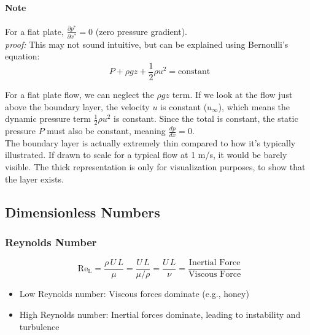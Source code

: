 \paragraph{Note} For a flat plate, $\frac{\partial p^*}{\partial x^*} = 0$ (zero pressure gradient).
\\[1em]
\textit{proof:} This may not sound intuitive, but can be explained using Bernoulli's equation:
\[
P + \rho gz + \frac{1}{2}\rho u^2 = \text{constant}
\]

For a flat plate flow, we can neglect the $\rho gz$ term. If we look at the flow just above the boundary layer, the velocity $u$ is constant ($u_\infty$), which means the dynamic pressure term $\frac{1}{2}\rho u^2$ is constant. Since the total is constant, the static pressure $P$ must also be constant, meaning $\frac{dp}{dx} = 0$.
\\[1em]
The boundary layer is actually extremely thin compared to how it's typically illustrated. If drawn to scale for a typical flow at 1 m/s, it would be barely visible. The thick representation is only for visualization purposes, to show that the layer exists.

\subsection*{Dimensionless Numbers}
\subsubsection*{Reynolds Number}
\begin{definition}
    \[
        \operatorname{Re_L} = \frac{\rho\, U\,L}{\mu} =\frac{U\, L}{\mu/\rho} = \frac{U\,L}{\nu} = \frac{\text{Inertial Force}}{\text{Viscous Force}}
    \]
\end{definition}
%
\begin{itemize}
    \item Low Reynolds number: Viscous forces dominate (e.g., honey)
    \item High Reynolds number: Inertial forces dominate, leading to instability and turbulence
\end{itemize}

